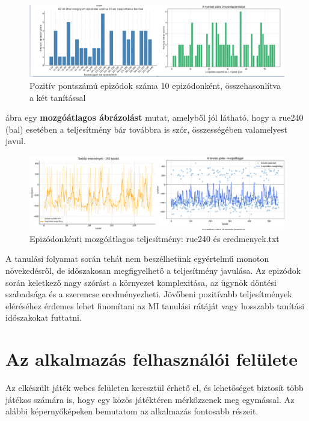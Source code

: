 \documentclass[
]{thesis-ekf}
\theoremstyle{definition}
\theoremstyle{remark}
\begin{document}
	\begin{figure}[ht!] 
		\centering \includegraphics[width=16cm]{winrate.png} \caption{Pozitív pontszámú epizódok száma 10 epizódonként, összehasonlítva a két tanítással} 
		\label{winrate}	
	\end{figure}
	
	 ábra egy \textbf{mozgóátlagos ábrázolást} mutat, amelyből jól látható, hogy a rue240 (bal) esetében a teljesítmény bár továbbra is szór, összességében valamelyest javul.
	
	\begin{figure}[ht!] 
		\centering \includegraphics[width=16cm]{mozgoatlag.png} \caption{Epizódonkénti mozgóátlagos teljesítmény: rue240 és eredmenyek.txt}
		\label{mozgoatlag}
	\end{figure}
	
	A tanulási folyamat során tehát nem beszélhetünk egyértelmű monoton növekedésről, de időszakosan megfigyelhető a teljesítmény javulása. Az epizódok során keletkező nagy szórást a környezet komplexitása, az ügynök döntési szabadsága és a szerencse eredményezheti. Jövőbeni pozitívabb teljesítmények eléréséhez érdemes lehet finomítani az MI tanulási rátáját vagy hosszabb tanítási időszakokat futtatni. 
	
	\section{Az alkalmazás felhasználói felülete}
	
	Az elkészült játék webes felületen keresztül érhető el, és lehetőséget biztosít több játékos számára is, hogy egy közös játéktéren mérkőzzenek meg egymással. Az alábbi képernyőképeken bemutatom az alkalmazás fontosabb részeit.
	
\end{document}
